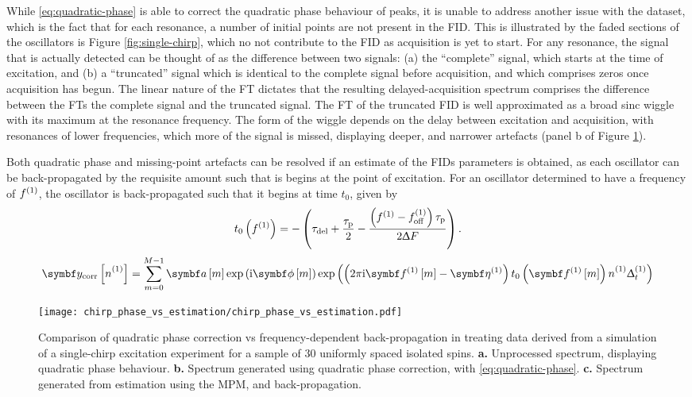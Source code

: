 While \eqref{eq:quadratic-phase} is able to correct the quadratic phase
behaviour of peaks, it is unable to address another issue with the dataset,
which is the fact that for each resonance, a number of initial points are not
present in the \ac{FID}. This is illustrated by the faded sections of the
oscillators is Figure \ref{fig:single-chirp}, which no not contribute to the
\ac{FID} as acquisition is yet to start. For any resonance, the signal that is
actually detected can be thought of as the difference between two signals: (a)
the ``complete'' signal, which starts at the time of excitation, and (b)
a ``truncated'' signal which is identical to the complete signal before
acquisition, and which comprises zeros once acquisition has begun. The
linear nature of the \ac{FT} dictates that the resulting delayed-acquisition
spectrum comprises the difference between the \acp{FT} the complete signal and
the truncated signal.  The \ac{FT} of the truncated \ac{FID} is well
approximated as a broad sinc
wiggle with its maximum at the resonance frequency. The form of the wiggle
depends on the delay between excitation and acquisition, with resonances of
lower frequencies, which more of the signal is missed, displaying deeper, and
narrower artefacts (panel b of Figure \ref{fig:chirp-phase-vs-backprop}).

Both quadratic phase and missing-point artefacts can be resolved if an estimate
of the \acp{FID} parameters is obtained, as each oscillator can be
back-propagated by the requisite amount such that is begins at the point of
excitation. For an oscillator determined to have a frequency of $f^{(1)}$, the
oscillator is back-propagated such that it begins at time $t_0$, given by
\begin{equation}
    t_0\left( f^{(1)} \right) =
        -\left(\tau_{\text{del}} + \frac{\tau_{\text{p}}}{2} -
        \frac{\left( f^{(1)} - f_{\mathrm{off}}^{(1)} \right) \tau_{\text{p}}}{2 \Updelta F}
    \right).
\end{equation}
\begin{subequations}
    \begin{gather}
        \by_{\text{corr}} \left[ \none \right] =
            \sum_{m=0}^{M-1} \bdam \exp \left( \iu \bdphim \right)
            \exp\left(
                \left( 2 \pi \iu \bdfonem - \bdetaone \right)
                t_0 \left(\bdfonem\right) \none \Dtone
                \right)
    \end{gather}
\end{subequations}

\begin{figure}
    \centering
    \texttt{[image: chirp\_phase\_vs\_estimation/chirp\_phase\_vs\_estimation.pdf]}
    \caption{
        Comparison of quadratic phase correction vs frequency-dependent
        back-propagation in treating data derived from a simulation of a
        single-chirp excitation experiment for a sample of 30 uniformly spaced
        isolated spins.
        \textbf{a.} Unprocessed spectrum, displaying quadratic phase behaviour.
        \textbf{b.} Spectrum generated using quadratic phase correction, with
        \eqref{eq:quadratic-phase}.
        \textbf{c.} Spectrum generated from estimation using the \ac{MPM}, and
        back-propagation.
    }
    \label{fig:chirp-phase-vs-backprop}
\end{figure}
